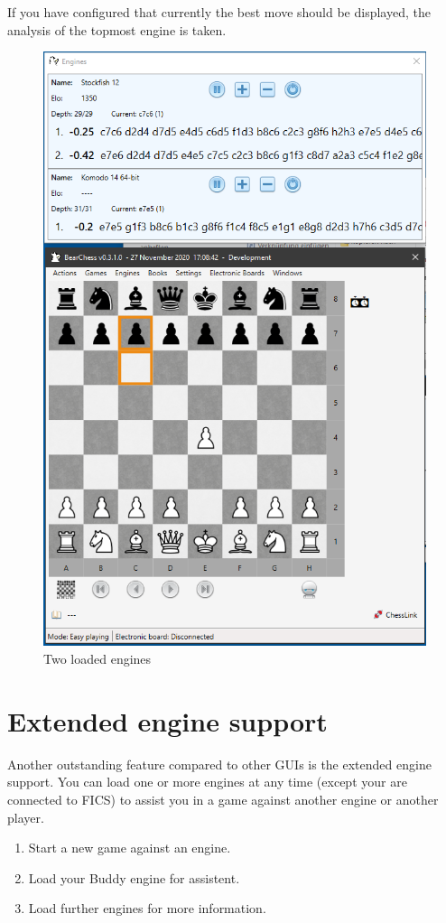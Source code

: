 \documentclass[11pt,a4paper]{article}
\begin{document}
If you have configured that currently the best move should be displayed, the analysis of the topmost engine is taken.

\begin{figure}[H]
	\centering
	\includegraphics[scale=0.7]{EngineWindow2.png}
	\caption{Two loaded engines}
	\label{fig:EngineWindow2}
\end{figure}

\section{Extended engine support}  \label{ExtendedSupport}

Another outstanding feature compared to other GUIs is the extended engine support. You can load one or more engines at any time (except your are connected to FICS) to assist you in a game against another engine or another player.
\begin{enumerate}
	\item Start a new game against an engine.
	\item Load your Buddy engine for assistent.
	\item Load further engines for more information.
\end{enumerate}
\end{document}
